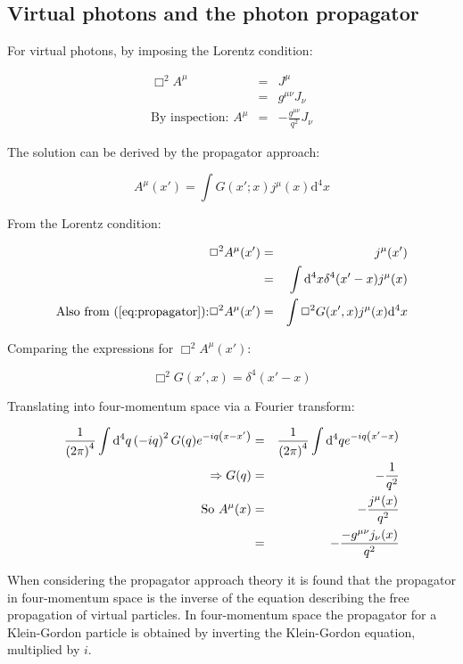 \subsection{Virtual photons and the photon propagator}

For virtual photons, by imposing the Lorentz condition:

\begin{eqnarray*}
  \Box^2A^{\mu} & = & J^{\mu} \\
  & = & g^{\mu\nu}J_{\nu} \\
  \textrm{By inspection: } A^{\mu} & = & -\frac{g^{\mu\nu}}{q^2}J_{\nu}
\end{eqnarray*}

The solution can be derived by the propagator approach:

\begin{equation}
  A^{\mu}(x') = \int G(x';x)j^{\mu}(x)\mathrm{d}^4x \label{eq:propagator}
\end{equation}

From the Lorentz condition:

\begin{eqnarray*}
  \Box^2A^{\mu}(x') & = & j^{\mu}(x') \\
  & = & \int\mathrm{d}^4x \delta^4(x'-x)j^{\mu}(x) \\
  \textrm{Also from (\ref{eq:propagator}):} \Box^2A^{\mu}(x') & = & \int\Box^2G(x',x)j^{\mu}(x)\mathrm{d}^4x
\end{eqnarray*}

Comparing the expressions for $\Box^2A^{\mu}(x')$:

\[
  \Box^2G(x',x) = \delta^4(x' - x)
\]

Translating into four-momentum space via a Fourier transform:

\begin{eqnarray*}
  \frac{1}{\left(2\pi\right)^4} \int\mathrm{d}^4q\left(-iq\right)^2G(q)e^{-iq\left(x - x'\right)} & = & \frac{1}{\left(2\pi\right)^4}\int\mathrm{d}^4q e^{-iq\left(x' - x\right)} \\
  \Rightarrow G(q) & = & -\frac{1}{q^2} \\
  \textrm{So } A^{\mu}(x) & = & -\frac{j^{\mu}(x)}{q^2} \\
  & = & -\frac{-g^{\mu\nu}j_{\nu}(x)}{q^2}
\end{eqnarray*}

When considering the propagator approach theory it is found that the propagator in four-momentum space is the inverse of the equation describing the free propagation of virtual particles.  In four-momentum space the propagator for a Klein-Gordon particle is obtained by inverting the Klein-Gordon equation, multiplied by $i$.

